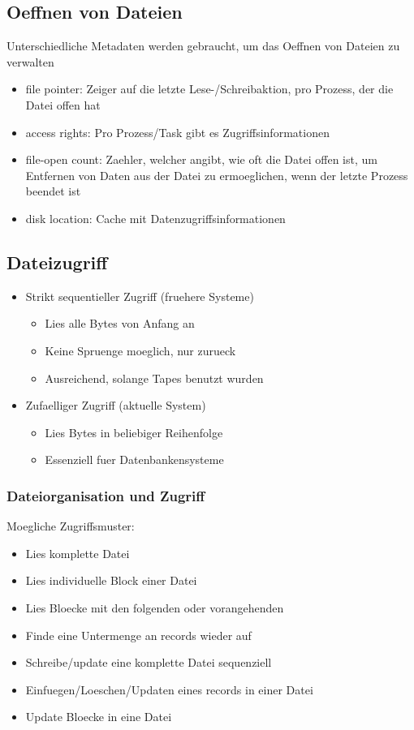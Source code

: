 \documentclass[a4paper]{scrreprt}
\begin{document}
\subsection{Oeffnen von Dateien}
Unterschiedliche Metadaten werden gebraucht, um das Oeffnen von Dateien zu verwalten
\begin{itemize}
	\item file pointer: Zeiger auf die letzte Lese-/Schreibaktion, pro Prozess, der die Datei offen hat
	\item access rights: Pro Prozess/Task gibt es Zugriffsinformationen
	\item file-open count: Zaehler, welcher angibt, wie oft die Datei offen ist, um Entfernen von Daten aus der Datei zu ermoeglichen, wenn der letzte Prozess beendet ist
	\item disk location: Cache mit Datenzugriffsinformationen
\end{itemize}

\subsection{Dateizugriff}
\begin{itemize}
	\item Strikt sequentieller Zugriff (fruehere Systeme)
		\begin{itemize}
			\item Lies alle Bytes von Anfang an
			\item Keine Spruenge moeglich, nur zurueck
			\item Ausreichend, solange Tapes benutzt wurden
		\end{itemize}
	\item Zufaelliger Zugriff (aktuelle System)
		\begin{itemize}
			\item Lies Bytes in beliebiger Reihenfolge
			\item Essenziell fuer Datenbankensysteme
		\end{itemize}
\end{itemize}

\subsubsection{Dateiorganisation und Zugriff}
Moegliche Zugriffsmuster:
\begin{itemize}
	\item Lies komplette Datei
	\item Lies individuelle Block einer Datei
	\item Lies Bloecke mit den folgenden oder vorangehenden
	\item Finde eine Untermenge an records wieder auf
	\item Schreibe/update eine komplette Datei sequenziell
	\item Einfuegen/Loeschen/Updaten eines records in einer Datei
	\item Update Bloecke in eine Datei
\end{itemize}
\end{document}
